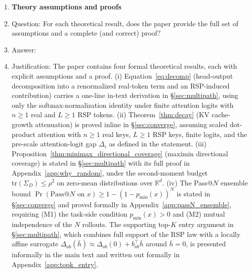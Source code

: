 \begin{enumerate}
\item {\bf Theory assumptions and proofs}
    \item[] Question: For each theoretical result, does the paper provide the full set of assumptions and a complete (and correct) proof?
    \item[] Answer: \answerYes{}
    \item[] Justification: The paper contains four formal theoretical results, each with explicit assumptions and a proof. (i) Equation~\eqref{eq:decomp} (head-output decomposition into a renormalized real-token term and an RSP-induced contribution) carries a one-line in-text derivation in \S\ref{sec:multipath}, using only the softmax-normalization identity under finite attention logits with $n\ge 1$ real and $L\ge 1$ RSP tokens. (ii) Theorem~\ref{thm:decay} (KV cache-growth attenuation) is proved inline in \S\ref{sec:converge}, assuming scaled dot-product attention with $n\ge 1$ real keys, $L\ge 1$ RSP keys, finite logits, and the pre-scale attention-logit gap $\Delta_i$ as defined in the statement. (iii) Proposition~\ref{thm:minimax_directional_coverage} (maximin directional coverage) is stated in \S\ref{sec:multipath} with its full proof in Appendix~\ref{app:why_random}, under the second-moment budget $\mathrm{tr}(\Sigma_D)\le\rho^2$ on zero-mean distributions over $\mathbb{R}^d$. (iv) The Pass@$N$ ensemble bound $\Pr(\mathrm{Pass@}N\text{ on }x)\ge 1-(1-p_{\min}(x))^N$ is stated in \S\ref{sec:converge} and proved formally in Appendix~\ref{app:passN_ensemble}, requiring (M1) the task-side condition $p_{\min}(x)>0$ and (M2) mutual independence of the $N$ rollouts. The supporting top-$K$ entry argument in \S\ref{sec:multipath}, which combines full support of the RSP law with a locally affine surrogate $\Delta_{ab}(\bar h)\approx\Delta_{ab}(0)+b_{ab}^\top\bar h$ around $\bar h=0$, is presented informally in the main text and written out formally in Appendix~\ref{app:topk_entry}.


\end{enumerate}
